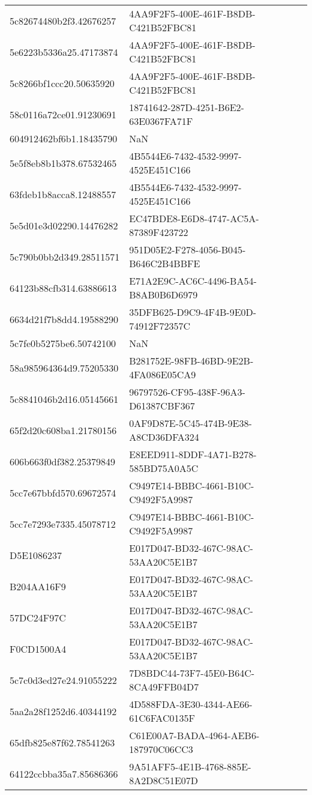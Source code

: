 \begin{tabular}{ll}
5c82674480b2f3.42676257 & 4AA9F2F5-400E-461F-B8DB-C421B52FBC81 \\
5e6223b5336a25.47173874 & 4AA9F2F5-400E-461F-B8DB-C421B52FBC81 \\
5c8266bf1ccc20.50635920 & 4AA9F2F5-400E-461F-B8DB-C421B52FBC81 \\
58c0116a72ce01.91230691 & 18741642-287D-4251-B6E2-63E0367FA71F \\
604912462bf6b1.18435790 & NaN \\
5e5f8eb8b1b378.67532465 & 4B5544E6-7432-4532-9997-4525E451C166 \\
63fdeb1b8acca8.12488557 & 4B5544E6-7432-4532-9997-4525E451C166 \\
5e5d01e3d02290.14476282 & EC47BDE8-E6D8-4747-AC5A-87389F423722 \\
5c790b0bb2d349.28511571 & 951D05E2-F278-4056-B045-B646C2B4BBFE \\
64123b88cfb314.63886613 & E71A2E9C-AC6C-4496-BA54-B8AB0B6D6979 \\
6634d21f7b8dd4.19588290 & 35DFB625-D9C9-4F4B-9E0D-74912F72357C \\
5c7fe0b5275be6.50742100 & NaN \\
58a985964364d9.75205330 & B281752E-98FB-46BD-9E2B-4FA086E05CA9 \\
5c8841046b2d16.05145661 & 96797526-CF95-438F-96A3-D61387CBF367 \\
65f2d20c608ba1.21780156 & 0AF9D87E-5C45-474B-9E38-A8CD36DFA324 \\
606b663f0df382.25379849 & E8EED911-8DDF-4A71-B278-585BD75A0A5C \\
5cc7e67bbfd570.69672574 & C9497E14-BBBC-4661-B10C-C9492F5A9987 \\
5cc7e7293e7335.45078712 & C9497E14-BBBC-4661-B10C-C9492F5A9987 \\
D5E1086237 & E017D047-BD32-467C-98AC-53AA20C5E1B7 \\
B204AA16F9 & E017D047-BD32-467C-98AC-53AA20C5E1B7 \\
57DC24F97C & E017D047-BD32-467C-98AC-53AA20C5E1B7 \\
F0CD1500A4 & E017D047-BD32-467C-98AC-53AA20C5E1B7 \\
5c7c0d3ed27e24.91055222 & 7D8BDC44-73F7-45E0-B64C-8CA49FFB04D7 \\
5aa2a28f1252d6.40344192 & 4D588FDA-3E30-4344-AE66-61C6FAC0135F \\
65dfb825e87f62.78541263 & C61E00A7-BADA-4964-AEB6-187970C06CC3 \\
64122ccbba35a7.85686366 & 9A51AFF5-4E1B-4768-885E-8A2D8C51E07D \\

\end{tabular}
